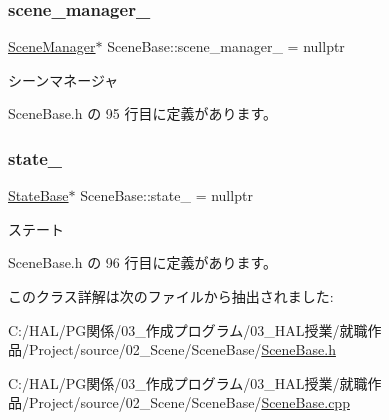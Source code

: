 \subsubsection{\texorpdfstring{scene\+\_\+manager\+\_\+}{scene\_manager\_}}
{\footnotesize\ttfamily \mbox{\hyperlink{class_scene_manager}{Scene\+Manager}}$\ast$ Scene\+Base\+::scene\+\_\+manager\+\_\+ = nullptr\hspace{0.3cm}{\ttfamily [private]}}



シーンマネージャ 



 Scene\+Base.\+h の 95 行目に定義があります。

\mbox{\label{class_scene_base_a9d8b7237f492e9ce0724714393b0e881}} 
\subsubsection{\texorpdfstring{state\+\_\+}{state\_}}
{\footnotesize\ttfamily \mbox{\hyperlink{class_scene_base_1_1_state_base}{State\+Base}}$\ast$ Scene\+Base\+::state\+\_\+ = nullptr\hspace{0.3cm}{\ttfamily [private]}}



ステート 



 Scene\+Base.\+h の 96 行目に定義があります。



このクラス詳解は次のファイルから抽出されました\+:\begin{DoxyCompactItemize}
\item 
C\+:/\+H\+A\+L/\+P\+G関係/03\+\_\+作成プログラム/03\+\_\+\+H\+A\+L授業/就職作品/\+Project/source/02\+\_\+\+Scene/\+Scene\+Base/\mbox{\hyperlink{_scene_base_8h}{Scene\+Base.\+h}}\item 
C\+:/\+H\+A\+L/\+P\+G関係/03\+\_\+作成プログラム/03\+\_\+\+H\+A\+L授業/就職作品/\+Project/source/02\+\_\+\+Scene/\+Scene\+Base/\mbox{\hyperlink{_scene_base_8cpp}{Scene\+Base.\+cpp}}\end{DoxyCompactItemize}
